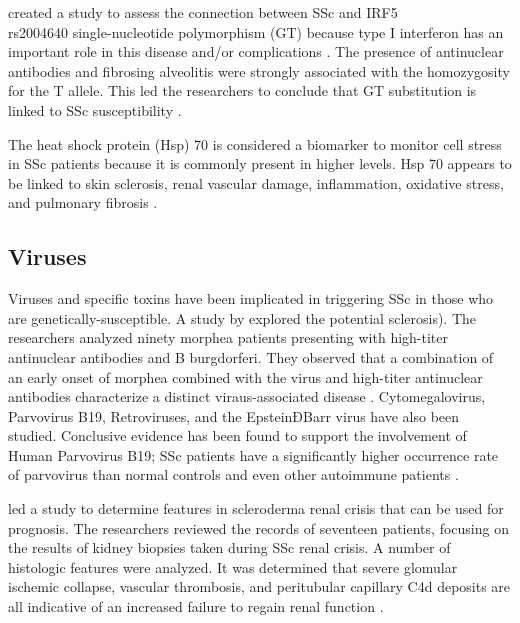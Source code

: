 \citeauthor{dieude} created a study to assess the connection between SSc and
IRF5 \\ rs2004640 single-nucleotide polymorphism (GT) because type I
interferon has an important role in this disease and/or complications
\citep{airo}. The presence of antinuclear antibodies and fibrosing alveolitis
were strongly associated with the homozygosity for the T allele. This led the
researchers to conclude that GT substitution is linked to SSc susceptibility
\citep{dieude}.

The heat shock protein (Hsp) 70 is considered a biomarker to monitor cell
stress in SSc patients because it is commonly present in higher levels. Hsp 70
appears to be linked to skin sclerosis, renal vascular damage, inflammation,
oxidative stress, and pulmonary fibrosis \citep{ogawa}.

\subsection{Viruses}

Viruses and specific toxins have been implicated in triggering SSc in those
who are genetically-susceptible. A study by \citeauthor{prinz} explored the
potential sclerosis). The researchers analyzed ninety morphea patients
presenting with high-titer antinuclear antibodies and B burgdorferi. They
observed that a combination of an early onset of morphea combined with the
virus and high-titer antinuclear antibodies characterize a distinct
viraus-associated disease \citep{prinz}. Cytomegalovirus, Parvovirus B19,
Retroviruses, and the EpsteinÐBarr virus have also been studied. Conclusive
evidence has been found to support the involvement of Human Parvovirus B19;
SSc patients have a significantly higher occurrence rate of parvovirus than
normal controls and even other autoimmune patients \citep{ohtsuka}.

\citeauthor{batal} led a study to determine features in scleroderma renal
crisis that can be used for prognosis. The researchers reviewed the records of
seventeen patients, focusing on the results of kidney biopsies taken during
SSc renal crisis. A number of histologic features were analyzed. It was
determined that severe glomular ischemic collapse, vascular thrombosis, and
peritubular capillary C4d deposits are all indicative of an increased failure
to regain renal function \citep{batal}.


